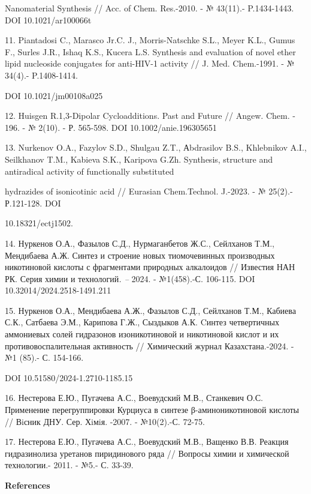 \begin{noparindent}
Nanomaterial Synthesis // Acc. of Chem.
Res.-2010. - № 43(11).- P.1434-1443. DOI 10.1021/ar100066t

11. Piantadosi C., Marasco Jr.C. J., Morris-Natschke S.L., Meyer K.L.,
Gumus F., Surles J.R., Ishaq K.S., Kucera L.S. Synthesis and evaluation
of novel ether lipid nucleoside conjugates for anti-HIV-1 activity // J.
Med. Chem.-1991. - № 34(4).- P.1408-1414.

DOI 10.1021/jm00108a025

12. Huisgen R.1,3-Dipolar Cycloadditions. Past and Future // Angew.
Chem. - 196. - № 2(10). - Р. 565-598. DOI 10.1002/anie.196305651

13. Nurkenov O.A., Fazylov S.D., Shulgau Z.T., Аbdrasilov B.S.,
Khlebnikov A.I., Seilkhanov T.M., Kabieva S.K., Karipova G.Zh.
Synthesis, structure and antiradical activity of functionally
substituted

hydrazides of isonicotinic acid // Eurasian Chem.Technol.
J.-2023. - № 25(2).- Р.121-128. DOI

10.18321/ectj1502.

14. Нуркенов О.А., Фазылов С.Д., Нурмаганбетов Ж.С., Сейлханов Т.М.,
Мендибаева А.Ж. Синтез и строение новых тиомочевинных производных
никотиновой кислоты с фрагментами природных алкалоидов // Известия НАН
РК. Серия химии и технологий\emph{. --} 2024. - №1(458).-С. 106-115. DOI
10.32014/2024.2518-1491.211

15. Нуркенов О.А., Мендибаева А.Ж., Фазылов С.Д., Сейлханов Т.М.,
Кабиева С.К., Сатбаева Э.М., Карипова Г.Ж., Сыздыков А.К. Cинтез
четвертичных аммониевых солей гидразонов изоникотиновой и никотиновой
кислот и их противовоспалительная активность // Химический журнал
Казахстана.-2024. - №1 (85).- С. 154-166.

DOI 10.51580/2024-1.2710-1185.15

16. Нестерова Е.Ю., Пугачева А.С., Воевудский М.В., Станкевич О.С.
Применение перегруппировки Курциуса в синтезе β-аминоникотиновой кислоты
// Вiсник ДНУ. Сер. Хiмiя. -2007. - №10(2).-С. 72-75.

17. Нестерова Е.Ю., Пугачева А.С., Воевудский М.В., Ващенко В.В. Реакция
гидразинолиза уретанов пиридинового ряда // Вопросы химии и химической
технологии.- 2011. - №5.- С. 33-39.
\end{noparindent}

\begin{center}
{\bfseries References}
\end{center}

